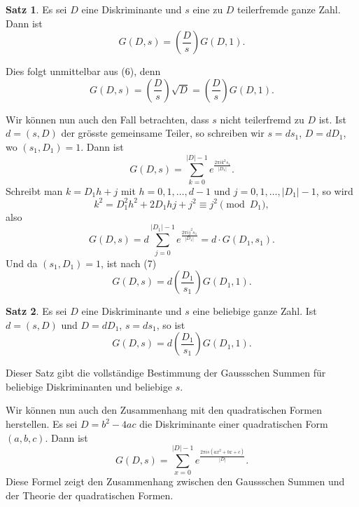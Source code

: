 \documentclass[12pt,a4paper]{article}
\theoremstyle{definition}
\newtheorem*{satz}{Satz}
\begin{document}
\begin{satz}
Es sei $D$ eine Diskriminante und $s$ eine zu $D$ teilerfremde
ganze Zahl. Dann ist
\begin{equation}\tag{7}
G(D, s) = \left(\frac{D}{s}\right) G(D, 1).
\end{equation}
\end{satz}

Dies folgt unmittelbar aus (6), denn
\begin{equation*}
G(D, s) = \left(\frac{D}{s}\right) \sqrt{D} = \left(\frac{D}{s}\right) G(D, 1).
\end{equation*}

Wir k\"onnen nun auch den Fall betrachten, dass $s$ nicht
teilerfremd zu $D$ ist. Ist $d = (s, D)$ der gr\"osste gemeinsame
Teiler, so schreiben wir $s = ds_1$, $D = dD_1$, wo $(s_1, D_1) = 1$.
Dann ist
\begin{equation}\tag{8}
G(D, s) = \sum_{k=0}^{|D|-1} e^{\frac{2\pi i k^2 s_1}{|D_1|}}.
\end{equation}
Schreibt man $k = D_1 h + j$ mit $h = 0, 1, \ldots, d-1$ und
$j = 0, 1, \ldots, |D_1|-1$, so wird
\begin{equation*}
k^2 = D_1^2 h^2 + 2D_1 hj + j^2 \equiv j^2 \pmod{D_1},
\end{equation*}
also
\begin{equation*}
G(D, s) = d \sum_{j=0}^{|D_1|-1} e^{\frac{2\pi i j^2 s_1}{|D_1|}} = d \cdot G(D_1, s_1).
\end{equation*}
Und da $(s_1, D_1) = 1$, ist nach (7)
\begin{equation}\tag{9}
G(D, s) = d \left(\frac{D_1}{s_1}\right) G(D_1, 1).
\end{equation}

\begin{satz}
Es sei $D$ eine Diskriminante und $s$ eine beliebige ganze
Zahl. Ist $d = (s, D)$ und $D = dD_1$, $s = ds_1$, so ist
\begin{equation}\tag{10}
G(D, s) = d \left(\frac{D_1}{s_1}\right) G(D_1, 1).
\end{equation}
\end{satz}

Dieser Satz gibt die vollst\"andige Bestimmung der Gaussschen
Summen f\"ur beliebige Diskriminanten und beliebige $s$.

Wir k\"onnen nun auch den Zusammenhang mit den quadratischen
Formen herstellen. Es sei $D = b^2 - 4ac$ die Diskriminante
einer quadratischen Form $(a, b, c)$. Dann ist
\begin{equation}\tag{11}
G(D, s) = \sum_{x=0}^{|D|-1} e^{\frac{2\pi i s (ax^2 + bx + c)}{|D|}}.
\end{equation}
Diese Formel zeigt den Zusammenhang zwischen den Gaussschen
Summen und der Theorie der quadratischen Formen.
\end{document}
